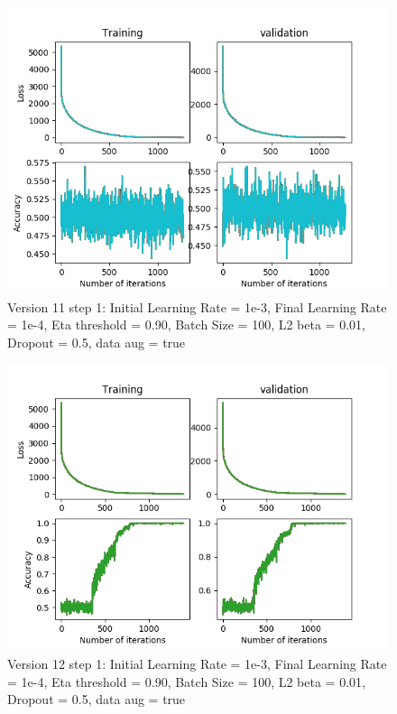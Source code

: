 \documentclass[12pt,reqno]{amsart}
\numberwithin{equation}{section}
\begin{document}
\begin{enumerate}
\begin{figure}[H]
\centering
\includegraphics[scale=0.6]{data_liquid10_version11_step1}
\caption{Version 11 step 1: Initial Learning Rate = 1e-3, Final Learning Rate = 1e-4, Eta threshold = 0.90, Batch Size = 100, L2 beta = 0.01, Dropout = 0.5, data aug = true}
\end{figure}

\begin{figure}[H]
\centering
\includegraphics[scale=0.6]{data_liquid10_version12_step1}
\caption{Version 12 step 1: Initial Learning Rate = 1e-3, Final Learning Rate = 1e-4, Eta threshold = 0.90, Batch Size = 100, L2 beta = 0.01, Dropout = 0.5, data aug = true}
\end{figure}


\end{enumerate}
\end{document}
